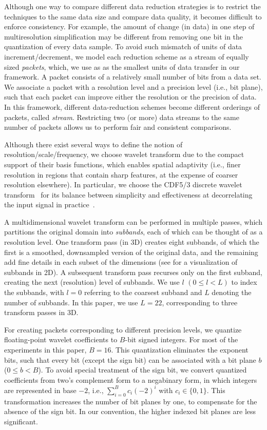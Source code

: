 Although one way to compare different data reduction strategies is to restrict the techniques to the
same data size and compare data quality, it becomes difficult to enforce consistency. For example,
the amount of change (in data) in one step of multiresolution simplification may be different from
removing one bit in the quantization of every data sample. To avoid such mismatch of units of data
increment/decrement, we model each reduction scheme as a stream of equally sized \emph{packets},
which, we use as as the smallest units of data transfer in our framework. A packet consists of a
relatively small number of bits from a data set. We associate a packet with a resolution level and a
precision level (i.e., bit plane), such that each packet can improve either the resolution or the
precision of data.  In this framework, different data-reduction schemes become different orderings
of packets, called \emph{stream}. Restricting two (or more) data streams to the same number of
packets allows us to perform fair and consistent comparisons.

 Although there exist several ways to define the
notion of resolution/scale/frequency, we choose wavelet transform due to the compact support of
their basis functions, which enables spatial adaptivity (i.e., finer resolution in regions that
contain sharp features, at the expense of coarser resolution elsewhere). In particular, we choose
the CDF5/3 discrete wavelet transform~\cite{cdf-wavelets} for its balance between simplicity and
effectiveness at decorrelating the input signal in practice~\cite{jpeg2000}.

A multidimensional wavelet transform can be performed in multiple passes, which partitions the
original domain into \emph{subbands}, each of which can be thought of as a resolution level. One
transform pass (in 3D) creates eight subbands, of which the first is a smoothed, downsampled version
of the original data, and the remaining add fine details in each subset of the dimensions (see
 for a visualization of subbands in 2D). A subsequent transform pass recurses
only on the first subband, creating the next (resolution) level of subbands. We use $l$ $(0 \leq l <
L)$ to index the subbands, with $l = 0$ referring to the coarsest subband and $L$ denoting the
number of subbands. In this paper, we use $L=22$, corresponding to three transform passes in 3D.

 For creating packets corresponding to different
precision levels, we quantize floating-point wavelet coefficients to $B$-bit signed integers. For
most of the experiments in this paper, $B=16$. This quantization eliminates the exponent bits, such
that every bit (except the sign bit) can be associated with a bit plane $b$ ($0\leq b < B$). To
avoid special treatment of the sign bit, we convert quantized coefficients from two's complement
form to a negabinary form, in which integers are represented in base $-2$, i.e.,
$\sum_{i=0}^{B}{c_i(-2)^i}$ with $c_i\in \{0,1\}$. This transformation increases the number of bit
planes by one, to compensate for the absence of the sign bit. In our convention, the higher indexed
bit planes are less significant.

